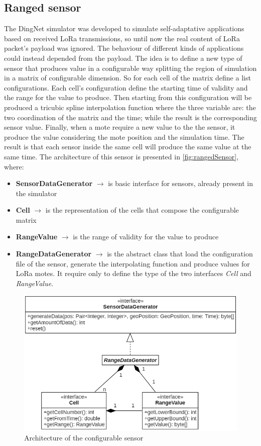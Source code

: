 \subsection{Ranged sensor}
The DingNet simulator was developed to simulate self-adaptative applications based on received LoRa transmissions, so until now the real content of LoRa packet's payload was ignored.
The behaviour of different kinds of applications could instead depended from the payload. 
The idea is to define a new type of sensor that produces value in a configurable way splitting the region of simulation in a matrix of configurable dimension. 
So for each cell of the matrix define a list configurations. 
Each cell's configuration define the starting time of validity and the range for the value to produce. 
Then starting from this configuration will be produced a tricubic spline interpolation function where the three variable are: the two coordination of the matrix and the time; while the result is the corresponding sensor value.
Finally, when a mote require a new value to the the sensor, it produce the value considering the mote position and the simulation time.
The result is that each sensor inside the same cell will produce the same value at the same time. 
The architecture of this sensor is presented in \autoref{fig:rangedSensor}, where:
\begin{itemize}
    \item \textbf{SensorDataGenerator} $\rightarrow$ is basic interface for sensors, already present in the simulator
    \item \textbf{Cell} $\rightarrow$ is the representation of the cells that compose the configurable matrix
    \item \textbf{RangeValue} $\rightarrow$ is the range of validity for the value to produce
    \item \textbf{RangeDataGenerator} $\rightarrow$ is the abstract class that load the configuration file of the sensor, generate the interpolating function and produce values for LoRa motes. It require only to define the type of the two interfaces \textit{Cell} and \textit{RangeValue}.
\end{itemize}
% 
\begin{figure}[h]
    \centering
    \includegraphics[scale=0.7]{figures/rangedSensor.png}
    \caption{Architecture of the configurable sensor}
    \label{fig:rangedSensor}
\end{figure}

